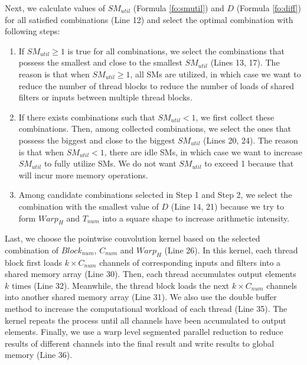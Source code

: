 Next, we calculate values of $SM_{util}$ (Formula \ref{fo:smutil}) and $D$ (Formula \ref{fo:diff}) for all satisfied combinations (Line 12) and select the optimal combination with following steps:
\begin{enumerate}[Step 1]
    \item If $SM_{util} \geq 1$ is true for all combinations, we select the combinations that possess the smallest and close to the smallest $SM_{util}$ (Lines 13, 17).
    The reason is that when $SM_{util} \geq 1$, all SMs are utilized, in which case we want to reduce the number of thread blocks to reduce the number of loads of shared filters or inputs between multiple thread blocks.
    \item If there exists combinations such that $SM_{util}<1$, we first collect these combinations. Then, among collected combinations, we select the ones that possess the biggest and close to the biggest $SM_{util}$ (Lines 20, 24).
    The reason is that when $SM_{util}<1$, there are idle SMs, in which case we want to increase $SM_{util}$ to fully utilize SMs. We do not want $SM_{util}$ to exceed 1 because that will incur more memory operations.
    \item Among candidate combinations selected in Step 1 and Step 2, we select the combination with the smallest value of $D$ (Line 14, 21) because we try to form $Warp_H$ and $T_{num}$ into a square shape to increase arithmetic intensity.
\end{enumerate}

Last, we choose the pointwise convolution kernel based on the selected combination of $Block_{num}$, $C_{num}$ and $Warp_H$ (Line 26). 
In this kernel, each thread block first loads $k \times C_{num}$ channels of corresponding inputs and filters into a shared memory array (Line 30). 
Then, each thread accumulates output elements $k$ times (Line 32). 
Meanwhile, the thread block loads the next $k \times C_{num}$ channels into another shared memory array (Line 31). 
We also use the double buffer method to increase the computational workload of each thread (Line 35).
The kernel repeats the process until all channels have been accumulated to output elements.
Finally, we use a warp level segmented parallel reduction to reduce results of different channels into the final result and write results to global memory (Line 36).  